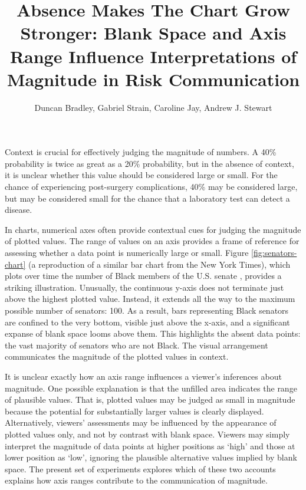 \documentclass[journal]{vgtc}                %
\title{Absence Makes The Chart Grow Stronger: Blank Space and Axis Range Influence Interpretations of Magnitude in Risk Communication}
\author{Duncan Bradley, Gabriel Strain, Caroline Jay, Andrew J. Stewart}
\begin{document}


\maketitle


{Context is crucial for effectively judging the magnitude of numbers. A 40\% probability is twice as great as a 20\% probability, but in the absence of context, it is unclear whether this value should be considered large or small. For the chance of experiencing post-surgery complications, 40\% may be considered large, but may be considered small for the chance that a laboratory test can detect a disease.

In charts, numerical axes often provide contextual cues for judging the magnitude of plotted values. The range of values on an axis provides a frame of reference for assessing whether a data point is numerically large or small. Figure \ref{fig:senators-chart} (a reproduction of a similar bar chart from the New York Times), which plots over time the number of Black members of the U.S. senate \citep{history_art__archives_us_house_of_representatives_office_of_the_historian_black-american_nodate}, provides a striking illustration. Unusually, the continuous y-axis does not terminate just above the highest plotted value. Instead, it extends all the way to the maximum possible number of senators: 100. As a result, bars representing Black senators are confined to the very bottom, visible just above the x-axis, and a significant expanse of blank space looms above them. This highlights the absent data points: the vast majority of senators who are not Black. The visual arrangement communicates the magnitude of the plotted values in context.

It is unclear exactly how an axis range influences a viewer's inferences about magnitude. One possible explanation is that the unfilled area indicates the range of plausible values. That is, plotted values may be judged as small in magnitude because the potential for substantially larger values is clearly displayed. Alternatively, viewers' assessments may be influenced by the appearance of plotted values only, and not by contrast with blank space. Viewers may simply interpret the magnitude of data points at higher positions as `high' and those at lower position as `low', ignoring the plausible alternative values implied by blank space. The present set of experiments explores which of these two accounts explains how axis ranges contribute to the communication of magnitude.}
\end{document}
